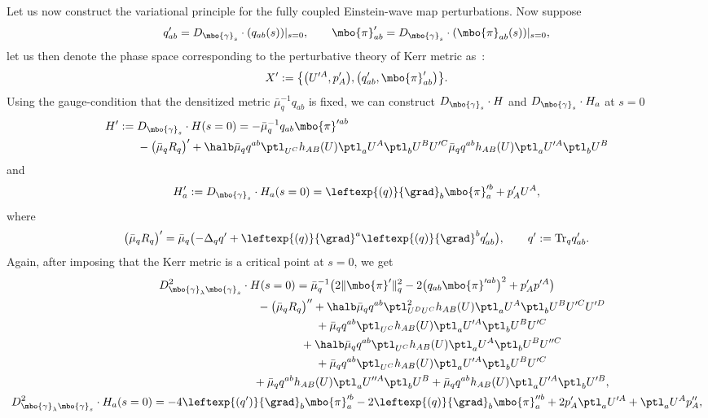  Let us now construct the variational principle for the fully coupled Einstein-wave map perturbations.
Now suppose
\begin{align*}
q'_{ab} = D_{\mbo{\gamma}_s} \cdot (q_{ab} (s)) \vert_{s=0}, \qquad \mbo{\pi}'_{ab} = D_{\mbo{\gamma}_s} \cdot (\mbo{\pi}_{ab} (s)) \vert_{s=0},
\end{align*}
let us then denote the phase space corresponding to the perturbative theory of Kerr metric as~:
\begin{align*}
X' := \bigl\{ \bigl(U'^{A}, p'_A\bigr), \bigl(q'_{ab}, \mbo{\pi}'_{ab}\bigr) \bigr\}.
\end{align*}
Using the gauge-condition that the densitized metric $\bar{\mu}^{-1}_q q_{ab}$ is fixed, we can construct $D_{\mbo{\gamma}_s} \cdot H $ and $D_{\mbo{\gamma}_s} \cdot H_a $ at $s=0$
\begin{align*}%
H':={}& D_{\mbo{\gamma}_s} \cdot H (s=0)=- \bar{\mu}^{-1}_q q_{ab} \mbo{\pi}'^{ab} \notag\\
 & - \bigl(\bar{\mu}_q R_q\bigr)'+ \halb \bar{\mu}_q q^{ab} \ptl_{U^C} h_{AB} (U) \ptl_a U^A \ptl_b U^B U'^C
\bar{\mu}_q q^{ab} h_{AB}(U) \ptl_a U'^A \ptl_b U^B
\end{align*}
and
\[
H'_a := D_{\mbo{\gamma}_s} \cdot H_a (s=0) = \leftexp{(q)}{\grad}_b \mbo{\pi}'^b_a + p'_A U^A,
\]
where
\[
\bigl(\bar{\mu}_q R_q\bigr)' = \bar{\mu}_q \bigl(- \Delta_q q' + \leftexp{(q)}{\grad}^a \leftexp{(q)}{\grad}^b q'_{ab} \bigr),\qquad q' := {\rm Tr}_q q'_{ab}.
\]
Again, after imposing that the Kerr metric is a critical point at $s=0$, we get
\begin{gather}
 D^2_{\mbo{\gamma}_\lambda \mbo{\gamma}_s} \cdot H(s=0) = \bar{\mu}^{-1}_q \bigl(2 \Vert \mbo{\pi}' \Vert_q^2 - 2\bigl(q_{ab} \mbo{\pi}'^{ab}\bigr)^2 + p'_A p'^A\bigr) \notag\\
 \hphantom{D^2_{\mbo{\gamma}_\lambda \mbo{\gamma}_s} \cdot H(s=0) =}{}
 - \bigl(\bar{\mu}_q R_q\bigr)'' + \halb \bar{\mu}_q q^{ab} \ptl^2_{U^D U^C} h_{AB}(U) \ptl_a U^A \ptl_b U^B U'^C U'^D \notag\\
 \hphantom{D^2_{\mbo{\gamma}_\lambda \mbo{\gamma}_s} \cdot H(s=0) =}{}
 + \bar{\mu}_q q^{ab} \ptl_{U^C} h_{AB}(U) \ptl_a U'^A \ptl_b U^B U'^C \notag\\
 \hphantom{D^2_{\mbo{\gamma}_\lambda \mbo{\gamma}_s} \cdot H(s=0) =}{}
 + \halb \bar{\mu}_q q^{ab} \ptl_{U^C} h_{AB}(U) \ptl_a U^A \ptl_b U^B U''^C \notag\\
 \hphantom{D^2_{\mbo{\gamma}_\lambda \mbo{\gamma}_s} \cdot H(s=0) =}{}
 + \bar{\mu}_q q^{ab} \ptl_{U^C} h_{AB} (U) \ptl_a U'^A \ptl_b U^B U'^C \notag\\
 \hphantom{D^2_{\mbo{\gamma}_\lambda \mbo{\gamma}_s} \cdot H(s=0) =}{}
 + \bar{\mu}_q q^{ab} h_{AB}(U) \ptl_a U''^A \ptl_b U^B + \bar{\mu}_q q^{ab} h_{AB} (U) \ptl_a U'^A \ptl_b U'^B ,\label{H''}\\
D^2_{\mbo{\gamma}_\lambda \mbo{\gamma}_s} \cdot H_a (s=0)
= -4 \leftexp{(q')}{\grad}_b \mbo{\pi}'^b_a -2 \leftexp{(q)}{\grad}_b \mbo{\pi}''^b_a + 2p'_A \ptl_a U'^A + \ptl_a U^A p''_A, \notag %
\end{gather}
